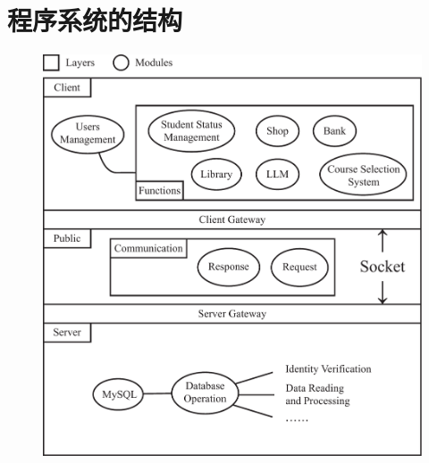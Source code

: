 \ifx\maindoc\undefined
\fi

\section{程序系统的结构}

\begin{figure}[h]
    \centering
    \includegraphics[width=0.9\columnwidth]{./images/structure.pdf}
\end{figure}